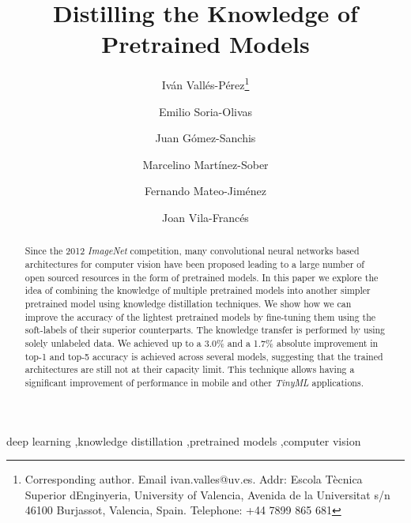 \documentclass{elsarticle}
\begin{document}
	\begin{frontmatter}
		\title{Distilling the Knowledge of Pretrained Models}
		\author[UV]{Iván Vallés-Pérez\footnote{Corresponding author. Email ivan.valles@uv.es. Addr: Escola Tècnica Superior d\textsc{}Enginyeria, University of Valencia, Avenida de la Universitat s/n 46100 Burjassot, Valencia, Spain.  Telephone: +44 7899 865 681}}
		\author[UV]{Emilio Soria-Olivas}
		\author[UV]{Juan Gómez-Sanchis}
		\author[UV]{Marcelino Martínez-Sober}%
		\author[UV]{Fernando Mateo-Jiménez}
		\author[UV]{Joan Vila-Francés}
		\address[UV]{Escola Tècnica Superior d\textsc{}Enginyeria, University of Valencia, Avenida de la Universitat s/n 46100 Burjassot, Valencia, Spain. \\ ivan.valles@uv.es, emilio.soria@uv.es, juan.gomez-sanchis@uv.es, marcelino.martinez@uv.es, fernando.mateo@uv.es, joan.vila@uv.es}

		\begin{abstract}
		Since the 2012 \textit{ImageNet} competition, many convolutional neural networks based architectures for computer vision have been proposed leading to a large number of open sourced resources in the form of pretrained models. In this paper we explore the idea of combining the knowledge of multiple pretrained models into another simpler pretrained model using knowledge distillation techniques. We show how we can improve the accuracy of the lightest pretrained models by fine-tuning them using the soft-labels of their superior counterparts. The knowledge transfer is performed by using solely unlabeled data. We achieved up to a 3.0\% and a 1.7\% absolute improvement in top-1 and top-5 accuracy is achieved across several models, suggesting that the trained architectures are still not at their capacity limit. This technique allows having a significant improvement of performance in mobile and other \textit{TinyML} applications.
		\end{abstract}
		
		\begin{keyword}
			deep learning \sep knowledge distillation \sep pretrained models \sep computer vision  
		\end{keyword}
		
	\end{frontmatter}
	
	\linenumbers
	
\end{document}
